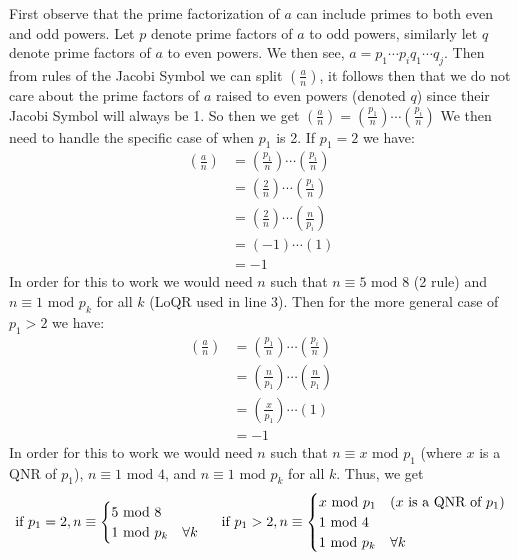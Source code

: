 \documentclass[class=article, crop=false]{standalone}
\def\leg#1#2{\left(\frac{#1}{#2}\right)}
\begin{document}
\subsubsection{}
First observe that the prime factorization of $a$ can include primes to both
  even and odd powers. Let $p$ denote prime factors of $a$ to odd powers,
  similarly let $q$ denote prime factors of $a$ to even powers. We then see,
  $a = p_1\cdots p_i q_1\cdots q_j$.
  Then from rules of the Jacobi Symbol we can split $\leg{a}{n}$,
  it follows then that we do not care about the prime factors of $a$ raised to
  even powers (denoted $q$) since their Jacobi Symbol will always be 1.
  So then we get
  $\leg{a}{n}=\leg{p_1}{n}\cdots\leg{p_i}{n}$
  We then need to handle the specific case of when $p_1$ is 2.
  If $p_1=2$ we have:
  \begin{align*}
    \leg{a}{n} &=\leg{p_1}{n}\cdots\leg{p_i}{n} \\
    &= \leg{2}{n}\cdots\leg{p_i}{n} \\
    &= \leg{2}{n}\cdots\leg{n}{p_i} \\
    &= (-1) \cdots (1) \\
    &= -1
  \end{align*}
  In order for this to work we would need $n$ such that $n\equiv 5\mbox{ mod }8$ (2 rule)
  and $n\equiv 1\mbox{ mod }p_k$ for all $k$ (LoQR used in line 3). Then for the more general
  case of $p_1>2$ we have:
  \begin{align*}
    \leg{a}{n} &=\leg{p_1}{n}\cdots\leg{p_i}{n} \\
    &=\leg{n}{p_1}\cdots\leg{n}{p_1} \\
    &=\leg{x}{p_1}\cdots(1)\\
    &= -1
  \end{align*}
  In order for this to work we would need $n$ such that $n\equiv x\mbox{ mod }p_1$ (where $x$ is a QNR of $p_1$),
  $n\equiv 1\mbox{ mod }4$, and
  $n\equiv 1\mbox{ mod }p_k$ for all $k$.
  Thus, we get
  $$\text{if }p_1=2, n \equiv\begin{cases}5\mbox{ mod }8 &\\1\mbox{ mod }p_k&\forall k\end{cases}
  \hspace{5mm}\text{if }p_1>2, n\equiv\begin{cases}x\mbox{ mod }p_1 &(x\text{ is a QNR of }p_1) \\
    1\mbox{ mod }4 &\\1\mbox{ mod }p_k &\forall k\end{cases}$$
\end{document}
